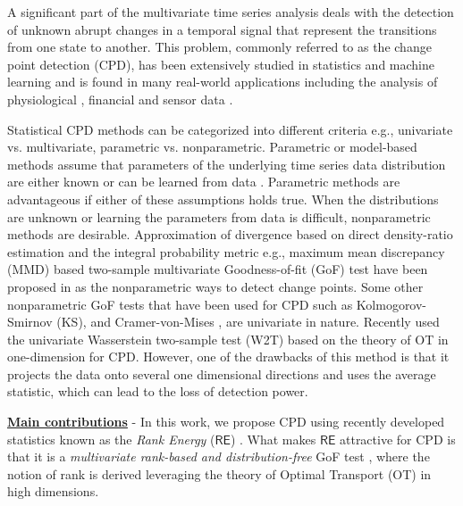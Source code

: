 \documentclass{article}
\begin{document}

A significant part of the multivariate time series analysis deals with the detection of unknown abrupt changes in a temporal signal that represent the transitions from one state to another. This problem, commonly referred to as the change point detection (CPD), has been extensively studied in statistics and machine learning and is found in many real-world applications including the analysis of physiological \cite{qi2014novel}, financial \cite{carvalho2007simulation} and sensor data \cite{he2006nonparametric}. 

Statistical CPD methods can be categorized into different criteria e.g., univariate vs. multivariate, parametric vs. nonparametric. Parametric or model-based methods assume that parameters of the underlying time series data distribution are either known or can be learned from data \cite{chamroukhi2013joint, lee2018time}. Parametric methods are advantageous if either of these assumptions holds true. When the distributions are unknown or learning the parameters from data is difficult, nonparametric methods are desirable. Approximation of divergence based on direct density-ratio estimation \cite{kanamori2009least} and the integral probability metric e.g., maximum mean discrepancy (MMD) \cite{gretton2012kernel} based two-sample multivariate Goodness-of-fit (GoF) test have been proposed in \cite{li2015scan, liu2013change} as the nonparametric ways to detect change points.
Some other nonparametric GoF tests that have been used for CPD such as Kolmogorov-Smirnov (KS), and Cramer-von-Mises \cite{hawkins2010nonparametric}, are univariate in nature. Recently \cite{cheng2020optimal} used the univariate Wasserstein two-sample test (W2T) based on the theory of OT in one-dimension \cite{ramdas2017wasserstein} for CPD. However, one of the drawbacks of this method is that it projects the data onto several one dimensional directions  and uses the average statistic, which can lead to the loss of detection power.

\textbf{\underline{Main contributions}} - In this work, we propose CPD using recently developed statistics known as the \textit{Rank Energy} ({\small $\mathsf{RE}$}) \cite{deb2021multivariate}. What makes {\small $\mathsf{RE}$} attractive for CPD is that it is a \textit{multivariate rank-based and distribution-free} GoF test \cite{deb2021multivariate}, where the notion of rank is derived leveraging the theory of Optimal Transport (OT) in high dimensions.
\end{document}
